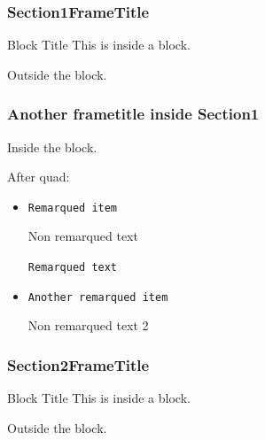 \documentclass[10pt]{beamer}
\begin{document}
\begin{frame}[fragile]
\frametitle{Section1FrameTitle}

\begin{block}{Block Title}
This is inside a block.


\end{block}

Outside the block.

\end{frame}

\begin{frame}
\frametitle{Another frametitle inside Section1}


\begin{block}{}
Inside the block.
\end{block}


\quad


After quad:

\begin{itemize}

\item {\tt Remarqued item}

Non remarqued text

{\tt Remarqued text} 

 \item {\tt Another remarqued item}

Non remarqued text 2 

\end{itemize}

\end{frame}




\begin{frame}[fragile]
\frametitle{Section2FrameTitle}

\begin{block}{Block Title}
This is inside a block.


\end{block}

Outside the block.

\end{frame}
\end{document}
